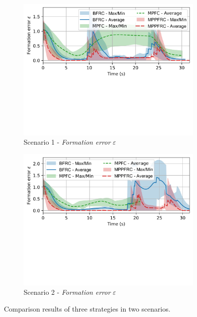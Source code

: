 \begin{figure}[h!]
\begin{subfigure}[b]{0.495\textwidth}
    \includegraphics[width=\textwidth]{paper3/images/error_scen1.pdf}
    \caption{Scenario 1 - \textit{Formation error} $\varepsilon$}
    \label{fig:error1}
    \end{subfigure}
    \begin{subfigure}[b]{0.495\textwidth}
    \includegraphics[width=\textwidth]{paper3/images/error_scen2.pdf}
    \caption{Scenario 2 - \textit{Formation error} $\varepsilon$}
    \label{fig:errorr2}
    \end{subfigure}
    \caption{Comparison results of three strategies in two scenarios.}
    \label{fig:comparison}
\end{figure}

